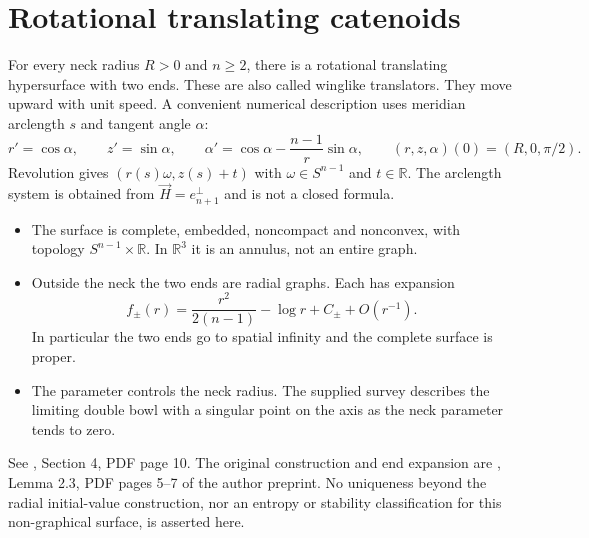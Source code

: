 \chapter{Rotational translating catenoids}\label{sec:catalogue-translating-catenoid}
\begin{example}\label{ex:catalogue-translating-catenoid}
For every neck radius $R>0$ and $n\geq2$, there is a rotational translating hypersurface with two ends. These are also called winglike translators. They move upward with unit speed. A convenient numerical description uses meridian arclength $s$ and tangent angle $\alpha$:
\[
 r'=\cos\alpha,\qquad z'=\sin\alpha,\qquad
 \alpha'=\cos\alpha-\frac{n-1}{r}\sin\alpha,
 \qquad (r,z,\alpha)(0)=(R,0,\pi/2).
\]
Revolution gives $(r(s)\omega,z(s)+t)$ with $\omega\in S^{n-1}$ and $t\in\mathbb R$. The arclength system is obtained from $\vec H=e_{n+1}^{\perp}$ and is not a closed formula.
\begin{itemize}
\item The surface is complete, embedded, noncompact and nonconvex, with topology $S^{n-1}\times\mathbb R$. In $\mathbb R^3$ it is an annulus, not an entire graph.
\item Outside the neck the two ends are radial graphs. Each has expansion
\[
 f_\pm(r)=\frac{r^2}{2(n-1)}-\log r+C_\pm+O(r^{-1}).
\]
In particular the two ends go to spatial infinity and the complete surface is proper.
\item The parameter controls the neck radius. The supplied survey describes the limiting double bowl with a singular point on the axis as the neck parameter tends to zero.
\end{itemize}
See \cite{CatHIMWNotes19}, Section 4, PDF page 10. The original construction and end expansion are \cite{CSS07}, Lemma 2.3, PDF pages 5--7 of the author preprint. No uniqueness beyond the radial initial-value construction, nor an entropy or stability classification for this non-graphical surface, is asserted here.
\end{example}


